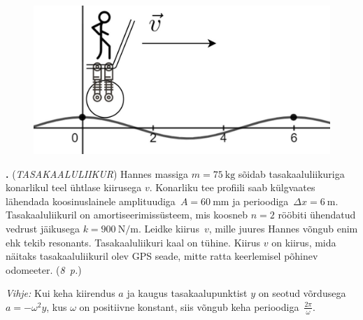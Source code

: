 \documentclass[11pt,a5paper]{article}
\newcommand{\numb}[1]{\vspace{5pt}\textbf{\large #1}}
\newcommand{\nimi}[1]{(\textsl{\small #1})}
\newcommand{\punktid}[1]{(\emph{#1~p.})}
\newcounter{ylesanne}
\newcommand{\yl}[1]{\addtocounter{ylesanne}{1}\numb{\theylesanne.} \nimi{#1} \newblock{}}
\begin{document}
\newpage
\begin{figure}
  \vspace{-5pt}
  \begin{center}
  \includegraphics[scale=0.1]{tasakaaluliikur.png}
  \end{center}
  \vspace{-25pt}
\end{figure}
\yl{TASAKAALULIIKUR}
Hannes massiga $m = \SI{75}{\kilo\gram}$ sõidab tasakaaluliikuriga  konarlikul
teel ühtlase kiirusega $v$. Konarliku tee profiili saab külgvaates lähendada
koosinuslainele amplituudiga~$A = \SI{60}{\milli\meter}$ ja
perioodiga~$\Delta x = \SI{6}{\meter}$. Tasakaaluliikuril on amortiseerimissüsteem,
mis koosneb $n=2$ rööbiti ühendatud vedrust jäikusega $k = \SI{900}{\newton\per\meter}$.
Leidke kiirus~$v$, mille juures Hannes võngub enim ehk tekib resonants.
Tasakaaluliikuri kaal on tühine. Kiirus $v$ on kiirus, mida näitaks
tasakaaluliikuril olev GPS seade, mitte ratta keerlemisel põhinev odomeeter.
\punktid{8}

\emph{Vihje:} Kui keha kiirendus $a$ ja kaugus tasakaalupunktist $y$ on seotud
võrdusega $a=-\omega^2 y$, kus $\omega$ on positiivne konstant, siis võngub keha
perioodiga~$\frac{2\pi}{\omega}$.
\end{document}
